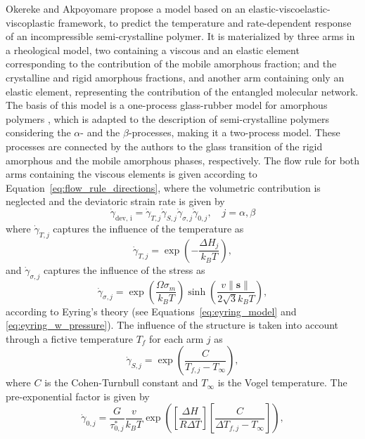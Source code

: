 Okereke and Akpoyomare \citep{okerekeTwoprocessConstitutiveModel2019} propose a model based on an elastic-viscoelastic-viscoplastic framework, to predict the temperature and rate-dependent response of an incompressible semi-crystalline polymer.
It is materialized by three arms in a rheological model, two containing a viscous and an elastic element corresponding to the contribution of the mobile amorphous fraction; and the crystalline and rigid amorphous fractions, and another arm containing only an elastic element, representing the contribution of the entangled molecular network.
The basis of this model is a one-process glass-rubber model for amorphous polymers \citep{buckleyGlassrubberConstitutiveModel1995}, which is adapted to the description of semi-crystalline polymers considering the $\alpha$- and the $\beta$-processes, making it a two-process model.
These processes are connected by the authors to the glass transition of the rigid amorphous and the mobile amorphous phases, respectively.
The flow rule for both arms containing the viscous elements is given according to Equation~\eqref{eq:flow_rule_directions}, where the volumetric contribution is neglected and the deviatoric strain rate is given by
\begin{equation}
	\dot \gamma_\text{dev, i} = \dot \gamma_{T,j}\dot\gamma_{S,j}\dot\gamma_{\sigma,j}\dot\gamma_{0,j},\quad j=\alpha, \beta
\end{equation}
where $\dot \gamma_{T,j}$ captures the influence of the temperature as
\begin{equation}
	\dot \gamma_{T,j} = \exp\left(-\frac{\Delta H_j}{k_B T}\right),
\end{equation}
and $\dot \gamma_{\sigma,j}$ captures the influence of the stress as
\begin{equation}
	\dot\gamma_{\sigma,j} = \exp\left(\frac{\Omega\sigma_m}{k_B T}\right)\sinh\left(\frac{v\|\mathbf s\|}{2\sqrt{3}k_BT}\right),
\end{equation}
according to Eyring's theory (see Equations~\eqref{eq:eyring_model} and \eqref{eq:eyring_w_pressure}).
The influence of the structure is taken into account through a fictive temperature $T_f$ for each arm $j$ as
\begin{equation}
	\dot\gamma_{S,j} = \exp\left(\frac{C}{T_{f,j}-T_\infty}\right),
\end{equation}
where $C$ is the Cohen-Turnbull constant and $T_\infty$ is the Vogel temperature.
The pre-exponential factor is given by
\begin{equation}
	\dot \gamma_{0,j} = \frac{G}{\tau^*_{0,j}} \frac{v}{k_B T}\exp\left(\left[\frac{\Delta H}{R\Delta T}\right]\left[\frac{C}{\Delta T_{f,j} - T_\infty}\right]\right),
\end{equation}
